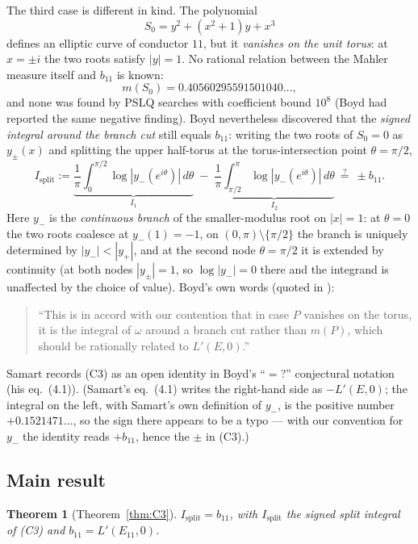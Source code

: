 \documentclass[11pt]{amsart}
\newtheorem*{theorem*}{Theorem}
\theoremstyle{definition}
\theoremstyle{remark}
\begin{document}
The third case is different in kind. The polynomial
\[
  S_0=y^2+(x^2+1)y+x^3
\]
defines an elliptic curve of conductor $11$, but it \emph{vanishes on the
unit torus}: at $x=\pm i$ the two roots satisfy $|y|=1$. No rational
relation between the Mahler measure itself and $b_{11}$ is known:
\[
  m(S_0)=0.40560295591501040\ldots,
\]
and none was found by PSLQ searches with coefficient bound $10^8$ (Boyd had
reported the same negative finding). Boyd nevertheless discovered that the \emph{signed
integral around the branch cut} still equals $b_{11}$: writing the two roots
of $S_0=0$ as $y_\pm(x)$ and splitting the upper half-torus at the
torus-intersection point $\theta=\pi/2$,
\[
  I_{\mathrm{split}}
  :=\underbrace{\frac1\pi\int_0^{\pi/2}\log|y_-(e^{i\theta})|\,d\theta}_{I_1}
  \;-\;\underbrace{\frac1\pi\int_{\pi/2}^{\pi}\log|y_-(e^{i\theta})|\,d\theta}_{I_2}
  \ \stackrel?=\ \pm b_{11}. \tag{C3}
\]
Here $y_-$ is the \emph{continuous branch} of the smaller-modulus root on
$|x|=1$: at $\theta=0$ the two roots coalesce at $y_-(1)=-1$, on
$(0,\pi)\setminus\{\pi/2\}$ the branch is uniquely determined by
$|y_-|<|y_+|$, and at the second node $\theta=\pi/2$ it is extended by
continuity (at both nodes $|y_\pm|=1$, so $\log|y_-|=0$ there and the
integrand is unaffected by the choice of value).
Boyd's own words (quoted in \cite{Samart2023}):
\begin{quote}
  ``This is in accord with our contention that in case $P$ vanishes on the
  torus, it is the integral of $\omega$ around a branch cut rather than
  $m(P)$, which should be rationally related to $L'(E,0)$.''
\end{quote}
Samart \cite{Samart2023} records (C3) as an open identity in Boyd's
``$=$?'' conjectural notation (his eq.~(4.1)).
(Samart's eq.~(4.1) writes the right-hand side as $-L'(E,0)$; the integral
on the left, with Samart's own definition of $y_-$, is the positive number
$+0.1521471\ldots$, so the sign there appears to be a typo --- with our
convention for $y_-$ the identity reads $+b_{11}$, hence the $\pm$ in
\textup{(C3)}.)

\subsection{Main result}

\begin{theorem*}[Theorem~\ref{thm:C3}]
$I_{\mathrm{split}}=b_{11}$, with $I_{\mathrm{split}}$ the signed split
integral of \textup{(C3)} and $b_{11}=L'(E_{11},0)$.
\end{theorem*}
\end{document}
